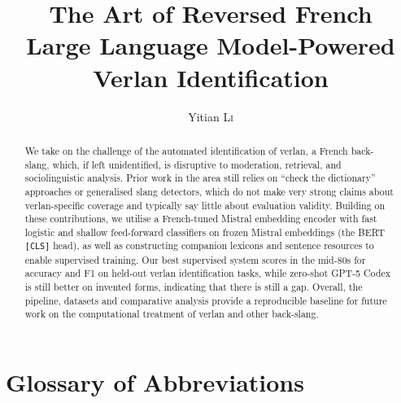 \documentclass[12pt]{article}
\title{The Art of Reversed French\\\large Large Language Model-Powered Verlan Identification}
\author{Yitian \textsc{Li}}
\newcommand{\blankpage}{%
  \clearpage
  \thispagestyle{empty}
  \null
  \clearpage}
\newif\ifskipsectionclear
\begin{document}
\maketitle

\blankpage

\begin{abstract}
We take on the challenge of the automated identification of verlan, a French back-slang, which, if left unidentified, is disruptive to moderation, retrieval, and sociolinguistic analysis. Prior work in the area still relies on ``check the dictionary'' approaches or generalised slang detectors, which do not make very strong claims about verlan-specific coverage and typically say little about evaluation validity. Building on these contributions, we utilise a French-tuned Mistral embedding encoder with fast logistic and shallow feed-forward classifiers on frozen Mistral embeddings (the BERT \texttt{[CLS]} head), as well as constructing companion lexicons and sentence resources to enable supervised training. Our best supervised system scores in the mid-80s for accuracy and F1 on held-out verlan identification tasks, while zero-shot GPT-5 Codex is still better on invented forms, indicating that there is still a gap. Overall, the pipeline, datasets and comparative analysis provide a reproducible baseline for future work on the computational treatment of verlan and other back-slang.
\end{abstract}

\blankpage
\tableofcontents
\thispagestyle{empty}

\cleardoublepage
\skipsectioncleartrue
{}
\setcounter{page}{1}

\section*{Glossary of Abbreviations}
\end{document}

